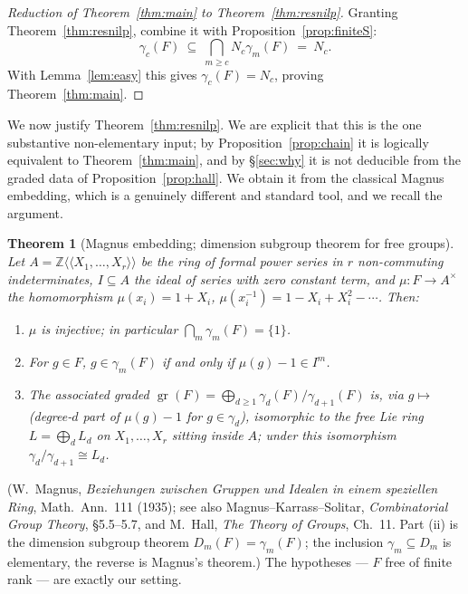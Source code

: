 \documentclass{amsart}
\newtheorem{theorem}{Theorem}
\theoremstyle{definition}
\theoremstyle{remark}
\begin{document}
\begin{proof}[Reduction of Theorem~\ref{thm:main} to Theorem~\ref{thm:resnilp}]
Granting Theorem~\ref{thm:resnilp}, combine it with
Proposition~\ref{prop:finiteS}:
\[
\gamma_c(F)\ \subseteq\ \bigcap_{m\ge c}N_c\gamma_m(F)\ =\ N_c .
\]
With Lemma~\ref{lem:easy} this gives $\gamma_c(F)=N_c$, proving
Theorem~\ref{thm:main}.
\end{proof}

We now justify Theorem~\ref{thm:resnilp}. We are explicit that this is the one
substantive non-elementary input; by Proposition~\ref{prop:chain} it is logically
equivalent to Theorem~\ref{thm:main}, and by \S\ref{sec:why} it is not deducible
from the graded data of Proposition~\ref{prop:hall}. We obtain it from the classical
Magnus embedding, which is a genuinely different and standard tool, and we recall the
argument.

\begin{theorem}[Magnus embedding; dimension subgroup theorem for free groups]
\label{thm:magnus}
Let $A=\mathbb Z\langle\!\langle X_1,\dots,X_r\rangle\!\rangle$ be the ring of
formal power series in $r$ non-commuting indeterminates, $I\subseteq A$ the ideal of
series with zero constant term, and $\mu\colon F\to A^{\times}$ the homomorphism
$\mu(x_i)=1+X_i$, $\mu(x_i^{-1})=1-X_i+X_i^{2}-\cdots$. Then:
\begin{enumerate}
\item[\textup{(i)}] $\mu$ is injective; in particular $\bigcap_{m}\gamma_m(F)=\{1\}$.
\item[\textup{(ii)}] For $g\in F$, $g\in\gamma_m(F)$ if and only if
$\mu(g)-1\in I^{m}$.
\item[\textup{(iii)}] The associated graded $\operatorname{gr}(F)=\bigoplus_{d\ge1}
\gamma_d(F)/\gamma_{d+1}(F)$ is, via $g\mapsto$ (degree-$d$ part of $\mu(g)-1$ for
$g\in\gamma_d$), isomorphic to the free Lie ring $L=\bigoplus_d L_d$ on
$X_1,\dots,X_r$ sitting inside $A$; under this isomorphism $\gamma_d/\gamma_{d+1}
\cong L_d$.
\end{enumerate}
\end{theorem}

\noindent(W.~Magnus, \emph{Beziehungen zwischen Gruppen und Idealen in einem
speziellen Ring}, Math.\ Ann.\ 111 (1935); see also Magnus--Karrass--Solitar,
\emph{Combinatorial Group Theory}, \S5.5--5.7, and M.~Hall, \emph{The Theory of
Groups}, Ch.~11. Part (ii) is the dimension subgroup theorem $D_m(F)=\gamma_m(F)$;
the inclusion $\gamma_m\subseteq D_m$ is elementary, the reverse is Magnus's
theorem.) The hypotheses --- $F$ free of finite rank --- are exactly our setting.
\end{document}
